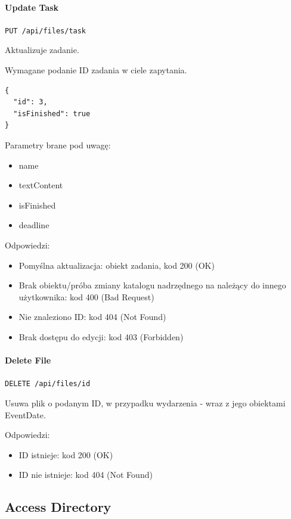 \documentclass[a4paper,twoside,12pt]{book}
\begin{document}
\paragraph{Update Task}\label{update-task}

\texttt{PUT /api/files/task}

Aktualizuje zadanie.

Wymagane podanie ID zadania w ciele zapytania.

\begin{verbatim}
{
  "id": 3,
  "isFinished": true
}
\end{verbatim}

Parametry brane pod uwagę: 
\begin{itemize}
	\item  name \item  textContent \item  isFinished \item  deadline
\end{itemize}

Odpowiedzi: 
\begin{itemize}
	\item Pomyślna aktualizacja: obiekt zadania, kod 200 (OK) 
	\item Brak obiektu/próba zmiany katalogu nadrzędnego na należący do innego użytkownika: kod 400 (Bad Request) 
	\item Nie znaleziono ID: kod 404 (Not Found)
	\item Brak dostępu do edycji: kod 403 (Forbidden)
\end{itemize}

\paragraph{Delete File}\label{delete-file}

\texttt{DELETE /api/files/{id}}

Usuwa plik o podanym ID, w przypadku wydarzenia - wraz z jego obiektami EventDate.

Odpowiedzi: 
\begin{itemize}
	\item ID istnieje: kod 200 (OK) 
	\item ID nie istnieje: kod 404 (Not Found)
\end{itemize}

\subsection{Access Directory}\label{access-directory}
\end{document}
